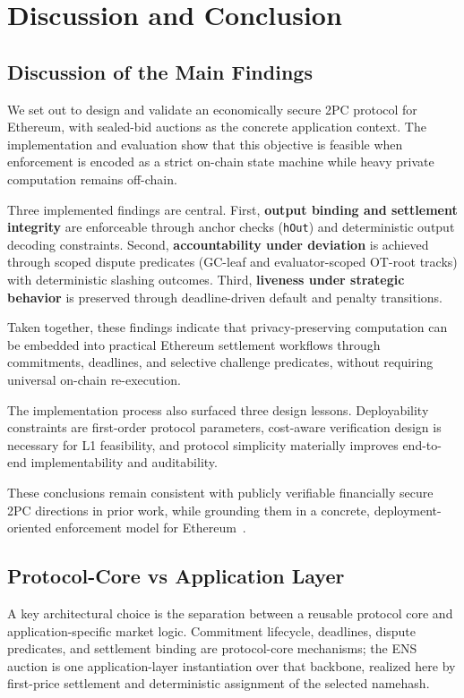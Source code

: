 \documentclass[final,twoside]{vutinfth}
\begin{document}
\chapter{Discussion and Conclusion}
\section{Discussion of the Main Findings}
We set out to design and validate an economically secure 2PC protocol for
Ethereum, with sealed-bid auctions as the concrete application context. The
implementation and evaluation show that this objective is feasible when
enforcement is encoded as a strict on-chain state machine while heavy private
computation remains off-chain.

Three implemented findings are central.
First, \textbf{output binding and settlement integrity} are enforceable through
anchor checks (\texttt{hOut}) and deterministic output decoding constraints.
Second, \textbf{accountability under deviation} is achieved through scoped
dispute predicates (GC-leaf and evaluator-scoped OT-root tracks) with
deterministic slashing outcomes.
Third, \textbf{liveness under strategic behavior} is preserved through
deadline-driven default and penalty transitions.

Taken together, these findings indicate that privacy-preserving computation can
be embedded into practical Ethereum settlement workflows through commitments,
deadlines, and selective challenge predicates, without requiring universal
on-chain re-execution.

The implementation process also surfaced three design lessons. Deployability
constraints are first-order protocol parameters, cost-aware verification design
is necessary for L1 feasibility, and protocol simplicity materially improves
end-to-end implementability and auditability.

These conclusions remain consistent with publicly verifiable financially secure
2PC directions in prior work, while grounding them in a concrete,
deployment-oriented enforcement model for Ethereum~\cite{Zhu2019PV2PC,BitPriv2025}.

\section{Protocol-Core vs Application Layer}
A key architectural choice is the separation between a reusable protocol core
and application-specific market logic.
Commitment lifecycle, deadlines, dispute predicates, and settlement binding are
protocol-core mechanisms; the ENS auction is one application-layer
instantiation over that backbone, realized here by first-price settlement and
deterministic assignment of the selected namehash.
\end{document}
